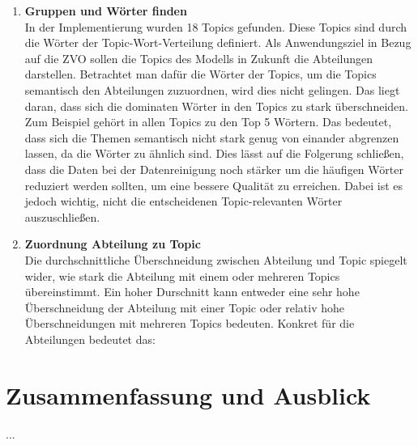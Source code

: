 \documentclass[german,version-2020-11]{uzl-thesis}
\begin{document}
\begin{enumerate}
\item \textbf{Gruppen und Wörter finden}\\
In der Implementierung wurden 18 Topics gefunden. Diese Topics sind durch die Wörter der Topic-Wort-Verteilung definiert. Als Anwendungsziel in Bezug auf die ZVO sollen die Topics des Modells in Zukunft die Abteilungen darstellen. Betrachtet man dafür die Wörter der Topics, um die Topics semantisch den Abteilungen zuzuordnen, wird dies nicht gelingen. Das liegt daran, dass sich die dominaten Wörter in den Topics zu stark überschneiden. Zum Beispiel gehört  in allen Topics zu den Top 5 Wörtern. Das bedeutet, dass sich die Themen semantisch nicht stark genug von einander abgrenzen lassen, da die Wörter zu ähnlich sind. Dies lässt auf die Folgerung schließen, dass die Daten bei der Datenreinigung noch stärker um die  häufigen Wörter reduziert werden sollten, um eine bessere Qualität zu erreichen. Dabei ist es jedoch wichtig, nicht die entscheidenen Topic-relevanten Wörter auszuschließen.
\\
\item \textbf{Zuordnung Abteilung zu Topic}\\
Die durchschnittliche Überschneidung zwischen Abteilung und Topic spiegelt wider, wie stark die Abteilung mit einem oder mehreren Topics übereinstimmt. Ein hoher Durschnitt kann entweder eine sehr hohe Überschneidung der Abteilung mit einer Topic oder relativ hohe Überschneidungen mit mehreren Topics bedeuten. Konkret für die Abteilungen bedeutet das: 
\end{enumerate}


\chapter{Zusammenfassung und Ausblick}%


%



...
\end{document}
